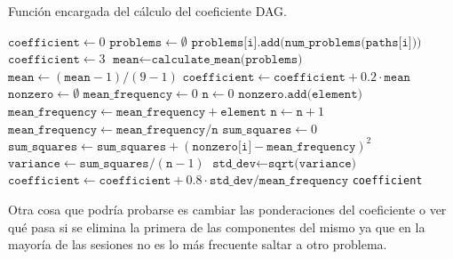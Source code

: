 \begin{algorithm}
\caption{Función encargada del cálculo del coeficiente DAG.}\label{alg:dag}
\begin{algorithmic}[1]
\State $\texttt{coefficient} \gets 0$
\State $\texttt{problems} \gets \emptyset$ 
\State $\texttt{problems[i].add(num\_problems(paths[i]))}$
\EndFor
{}
\State $\texttt{coefficient} \gets 3$
\Else
\State $\texttt{mean} \gets \texttt{calculate\_mean(problems)}$
\State $\texttt{mean} \gets (\texttt{mean} - 1) / (9-1)$ 
\State $\texttt{coefficient} \gets \texttt{coefficient} + 0.2 \cdot \texttt{mean}$
\State $\texttt{nonzero} \gets \emptyset$
\State $\texttt{mean\_frequency} \gets 0$
\State $\texttt{n} \gets 0$
\State $\texttt{nonzero.add(element)}$
\State $\texttt{mean\_frequency} \gets \texttt{mean\_frequency} + \texttt{element}$
\State $\texttt{n} \gets \texttt{n}+1$
\EndIf
\EndFor
\EndFor
\State $\texttt{mean\_frequency} \gets \texttt{mean\_frequency}/\texttt{n}$
\State $\texttt{sum\_squares} \gets 0$
\State $\texttt{sum\_squares} \gets \texttt{sum\_squares} + (\texttt{nonzero[i]}-\texttt{mean\_frequency})^2$
\EndFor
\State $\texttt{variance} \gets \texttt{sum\_squares}/(\texttt{n}-1)$
\State $\texttt{std\_dev} \gets \texttt{sqrt(variance)}$
\State $\texttt{coefficient} \gets \texttt{coefficient} + 0.8 \cdot \texttt{std\_dev}/\texttt{mean\_frequency}$
\EndIf
\State \Return \texttt{coefficient}
\EndFunction
\end{algorithmic}
\end{algorithm}

Otra cosa que podría probarse es cambiar las ponderaciones del coeficiente
o ver qué pasa si se elimina la primera de las componentes del mismo ya que en la mayoría de las sesiones no es lo más frecuente saltar a otro problema.